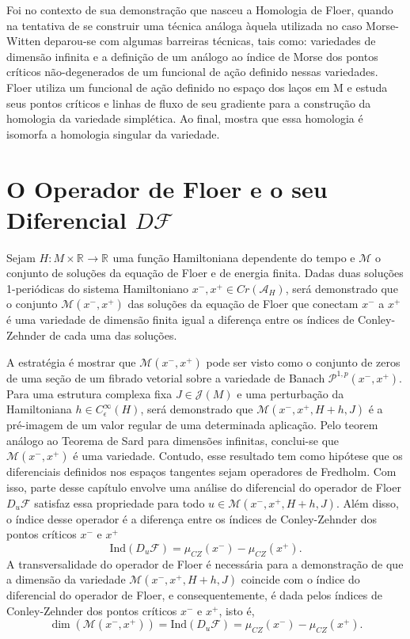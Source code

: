 \documentclass[12pt]{book}
\newcommand{\caminhosexponenciaisconectantes}[2]{\mathcal{P}^{1,p}(#1, #2)}
\newcommand{\caminhosexponenciaisconectantespadrao}{\caminhosexponenciaisconectantes{x^{-}}{x^{+}}}
\newcommand{\diferencialfloer}{D\operadorFloer}
\newcommand{\diferencialfloerponto}[1]{D_{#1}\operadorFloer}
\newcommand{\energiafinitaM}{\mathcal{M}}
\newcommand{\energiafinitaMconectante}{\energiafinitaM(x^{-}, x^{+})}
\newcommand{\energiafinitaMconectanteHamiltoniana}{\energiafinitaM(x^{-}, x^{+},H+h,J)}
\newcommand{\estruturascomplexasM}{\mathcal{J}(M)}
\newcommand{\funcionalH}{\mathcal{A}_{H}}
\newcommand{\iconley}[1]{\iconleyabrev(#1)}
\newcommand{\iconleyabrev}{\mu_{CZ}}
\newcommand{\ind}{\text{Ind}}
\newcommand{\operadorFloer}{\mathcal{F}}
\newcommand{\perturbacaoHamiltoniana}[1]{C^{\infty}_{\epsilon}(#1)}
\newcommand{\pontoscriticos}[1]{\textit{Cr}(#1)}
\newcommand{\real}[1]{\mathbb{R}^{#1}}
\newcommand{\reta}{\real{}}
\begin{document}
	Foi no contexto de sua demonstração que nasceu a Homologia de Floer, quando na tentativa de se construir uma técnica análoga àquela utilizada no caso Morse-Witten deparou-se com algumas barreiras técnicas, tais como: variedades de dimensão infinita e a definição de um análogo ao índice de Morse dos pontos críticos não-degenerados de um funcional de ação definido nessas variedades. Floer utiliza um funcional de ação definido no espaço dos laços em M e estuda seus pontos críticos e linhas de fluxo de seu gradiente para a construção da homologia da variedade simplética. Ao final, mostra que essa homologia é isomorfa a homologia singular da variedade.
	
	
	\section{O Operador de Floer e o seu Diferencial $\diferencialfloer$}\label{apendice_variedades_banach}
	
	Sejam $H:M\times \reta\to \reta$ uma função Hamiltoniana dependente do tempo e $\energiafinitaM$ o conjunto de soluções da equação de Floer e de energia finita. Dadas duas soluções 1-periódicas do sistema Hamiltoniano $x^{-}, x^{+} \in \pontoscriticos{\funcionalH}$, será demonstrado que o conjunto $\energiafinitaMconectante$ das soluções da equação de Floer que conectam $x^{-}$ a $x^{+}$ é uma variedade de dimensão finita igual a diferença entre os índices de Conley-Zehnder de cada uma das soluções.
	
	A estratégia é mostrar que $\energiafinitaMconectante$ pode ser visto como o conjunto de zeros de uma seção de um fibrado vetorial sobre a variedade de Banach $\caminhosexponenciaisconectantespadrao$. Para uma estrutura complexa fixa $J \in \estruturascomplexasM$ e uma perturbação da Hamiltoniana $h\in \perturbacaoHamiltoniana{H}$, será demonstrado que $\energiafinitaMconectanteHamiltoniana$ é a pré-imagem de um valor regular de uma determinada aplicação. Pelo teorem análogo ao Teorema de Sard para dimensões infinitas, conclui-se que $\energiafinitaMconectante$ é uma variedade. Contudo, esse resultado tem como hipótese que os diferenciais definidos nos espaços tangentes sejam operadores de Fredholm. Com isso, parte desse capítulo envolve uma análise do diferencial do operador de Floer $\diferencialfloerponto{u}$ satisfaz essa propriedade para todo $u\in \energiafinitaMconectanteHamiltoniana$. Além disso, o índice desse operador é a diferença entre os índices de Conley-Zehnder dos pontos críticos $x^{-}$ e $x^{+}$
	$$
	\ind(\diferencialfloerponto{u})=\iconley{x^{-}}-\iconley{x^{+}}.
	$$
	A transversalidade do operador de Floer é necessária para a demonstração de que a dimensão da variedade $\energiafinitaMconectanteHamiltoniana$ coincide com o índice do diferencial do operador de Floer, e consequentemente, é dada pelos índices de Conley-Zehnder dos pontos críticos $x^{-}$ e $x^{+}$, isto é,
	$$
	\dim(\energiafinitaMconectante)= \ind(\diferencialfloerponto{u}) = \iconley{x^{-}}-\iconley{x^{+}}.
	$$
	
\end{document}
